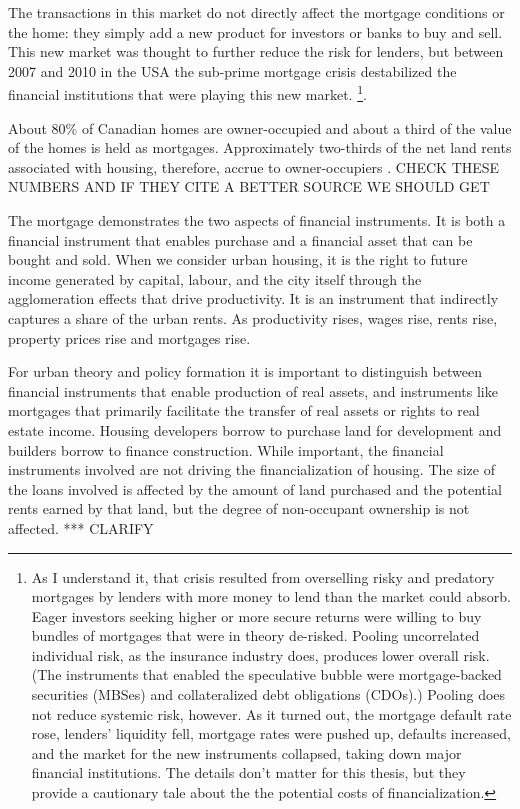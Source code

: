 The transactions in this market do not directly affect the mortgage conditions or the home: they simply add a new product for investors or banks to buy and sell. This new market was thought to further reduce the risk for lenders, but  between 2007 and 2010 in the USA the sub-prime mortgage crisis destabilized the financial institutions that were playing this new market. \footnote{As I understand it, that crisis resulted from overselling risky and predatory mortgages by lenders with more money to lend than the market could absorb. Eager investors seeking higher or more secure returns were willing  to buy bundles of  mortgages that were in theory de-risked. Pooling uncorrelated individual risk, as the insurance industry does, produces lower overall risk. (The instruments that enabled the speculative bubble were mortgage-backed securities (MBSes) and collateralized debt obligations (CDOs).) Pooling does not reduce systemic risk, however. As it turned out, the mortgage default rate rose, lenders' liquidity fell, mortgage rates were pushed up, defaults increased, and the market for the new instruments collapsed, taking down major financial institutions. The details don't matter for this thesis, but they provide a cautionary tale about the the potential costs of financialization.}.  

About 80\% of Canadian homes are owner-occupied and about a third of the value of the homes is held as mortgages. Approximately two-thirds of the net land rents associated with housing, therefore, accrue to owner-occupiers \cite{nemtinFinancializationHousingSocial2021}. {\color {red}CHECK THESE NUMBERS AND IF THEY CITE A BETTER SOURCE WE SHOULD GET} 

The mortgage demonstrates the two aspects of financial instruments. It is both a financial instrument that enables  purchase and a financial asset that can be bought and sold. When we consider urban housing, it is the right to future income generated by capital, labour, and the city itself through the agglomeration effects that drive productivity. It is an instrument that indirectly captures a share of the urban rents. As productivity rises, wages rise, rents rise, property prices rise and mortgages rise. 

For urban theory and policy formation it is important to distinguish between financial instruments that enable production of real assets, and instruments like  mortgages that primarily facilitate the transfer of real assets or rights to real estate  income. Housing developers borrow to purchase land for development and builders borrow to finance construction. While important, the financial instruments involved are not driving the financialization of housing.  The size of the loans involved is affected by the amount of land purchased and the potential rents earned by that land, but the degree of non-occupant ownership is not affected. *** CLARIFY

